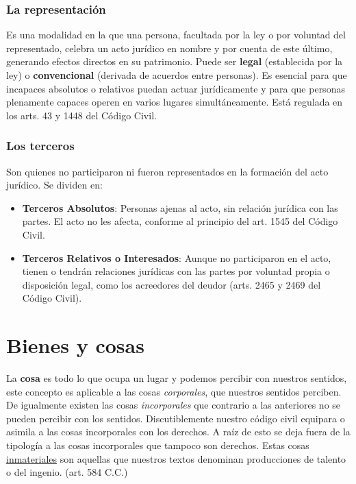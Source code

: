 \documentclass{templateNote}
\begin{document}
\subsubsection{La representación}
Es una modalidad en la que una persona, facultada por la ley o por voluntad del representado, celebra un acto jurídico en nombre y por cuenta de este último, generando efectos directos en su patrimonio. Puede ser \textbf{legal} (establecida por la ley) o \textbf{convencional} (derivada de acuerdos entre personas). Es esencial para que incapaces absolutos o relativos puedan actuar jurídicamente y para que personas plenamente capaces operen en varios lugares simultáneamente. Está regulada en los arts. 43 y 1448 del Código Civil.

\subsubsection{Los terceros}
Son quienes no participaron ni fueron representados en la formación del acto jurídico. Se dividen en:

\begin{itemize}
    \item \textbf{Terceros Absolutos}: Personas ajenas al acto, sin relación jurídica con las partes. El acto no les afecta, conforme al principio del art. 1545 del Código Civil.
    \item \textbf{Terceros Relativos o Interesados}: Aunque no participaron en el acto, tienen o tendrán relaciones jurídicas con las partes por voluntad propia o disposición legal, como los acreedores del deudor (arts. 2465 y 2469 del Código Civil).
\end{itemize}

\newpage
\section{Bienes y cosas}

La \textbf{cosa} es todo lo que ocupa un lugar y podemos percibir con nuestros sentidos, este concepto es aplicable a las cosas \textit{corporales}, que nuestros sentidos perciben.
De igualmente existen las cosas \textit{incorporales} que contrario a las anteriores no se pueden percibir con los sentidos. 
Discutiblemente nuestro código civil equipara o asimila a las cosas incorporales con los derechos. A raíz de esto se deja fuera de la tipología a las cosas incorporales que tampoco son derechos.
Estas cosas \underline{inmateriales} son aquellas que nuestros textos denominan producciones de talento o del ingenio. (art. 584 C.C.)
\end{document}
